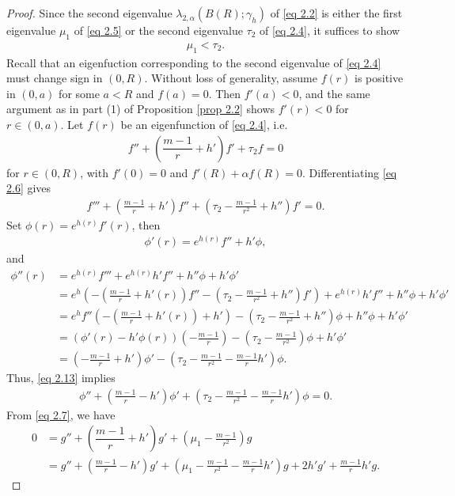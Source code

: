 \documentclass[11pt,leqno]{amsart}
\def\a{\alpha}
\def\l{\lambda}
\numberwithin{equation}{section}
\begin{document}
\begin{proof}
  Since the second eigenvalue $\l_{2, \a}(B(R);\gamma_h)$ of \eqref{eq 2.2} is  either the first eigenvalue $\mu_1$ of \eqref{eq 2.5}
 or the second eigenvalue $\tau_2$ of \eqref{eq 2.4},  it suffices to show
\begin{align*}
    \mu_1<\tau_2.
\end{align*}
Recall that an eigenfuction corresponding to the second eigenvalue of \eqref{eq 2.4} must change sign in $(0,R)$. Without loss of generality, assume $f(r)$ is positive in $(0, a)$ for some $a<R$ and $f(a)=0$. Then  $f'(a)<0$, and the same argument as in part (1) of Proposition \ref{prop 2.2} shows $f'(r)<0$ for $r\in(0, a)$.
Let  $f(r)$ be an eigenfunction of \eqref{eq 2.4}, i.e.
\begin{align}\label{eq 2.6}
 f'' + \left( \dfrac{m-1}{r} + h' \right)f' + \tau_2 f = 0  
\end{align}
for $r\in (0, R)$, with $f'(0)=0$ and $f'(R)+\a f(R)=0$.
Differentiating  \eqref{eq 2.6} gives
\begin{align}\label{eq 2.13}
    f'''+(\frac{m-1}{r}+h')f''+(\tau_{2}-\frac{m-1}{r^{2}}+h'')f'=0.
\end{align}
Set $\phi(r)=e^{h(r)}f'(r)$,  then 
\begin{align*}
    \phi'(r)=e^{h(r)}f''+h'\phi, 
\end{align*}
and
\begin{align*}
    \phi''(r)&=e^{h(r)}f'''+e^{h(r)}h'f''+h''\phi+h'\phi'\\
    &=e^{h}(-(\frac{m-1}{r}+h'(r))f''-(\tau_2-\frac{m-1}{r^{2}}+h'')f')+e^{h(r)}h'f''+h''\phi+h'\phi'\\
    &=e^{h}f''(-(\frac{m-1}{r}+h'(r))+h')-(\tau_{2}-\frac{m-1}{r^{2}}+h'')\phi+h''\phi+h'\phi'\\
    &=(\phi'(r)-h'\phi(r))(-\frac{m-1}{r})-(\tau_{2}-\frac{m-1}{r^{2}})\phi+h'\phi'\\
&=(-\frac{m-1}{r}+h')\phi'-(\tau_{2}-\frac{m-1}{r^{2}}-\frac{m-1}{r}h')\phi.
\end{align*}
Thus, \eqref{eq 2.13} implies
\begin{align}\label{eq 2.14}
    \phi''+(\frac{m-1}{r}-h')\phi'+(\tau_{2}-\frac{m-1}{r^{2}}-\frac{m-1}{r}h')\phi=0.
\end{align}
From  \eqref{eq 2.7}, we have
\begin{align*}
    0&=g'' + \left( \dfrac{m-1}{r} + h' \right) g'+ (\mu_{1}-\frac{m-1}{r^{2}}) g\\
    &=g''+(\frac{m-1}{r}-h')g'+(\mu_{1}-\frac{m-1}{r^{2}}-\frac{m-1}{r}h') g+2h'g'+\frac{m-1}{r}h'g.

\end{align*}
\end{proof}
\end{document}
